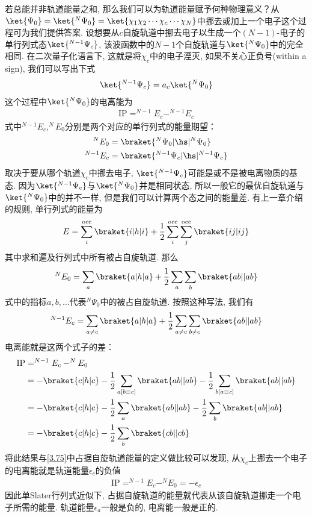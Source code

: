 若总能并非轨道能量之和, 那么我们可以为轨道能量赋予何种物理意义？从$\ket{\Psi_0}=\ket{^N\Psi_0}=\ket{\chi_1\chi_2\cdots\chi_c\cdots\chi_N}$中挪去或加上一个电子这个过程可为我们提供答案. 设想要从$c$自旋轨道中挪去电子以生成一个$(N-1)$-电子的单行列式态$\ket{^{N-1}\Psi_c}$, 该波函数中的$N-1$个自旋轨道与$\ket{^N\Psi_0}$中的完全相同. 在二次量子化语言下, 这就是将$\chi_c$中的电子湮灭, 如果不关心正负号(within a sign), 我们可以写出下式
\begin{align}
\ket{^{N-1}\Psi_c} = a_c\ket{^N\Psi_0}
\end{align}
这个过程中$\ket{^N\Psi_0}$的电离能为
\begin{align}
\mathrm{IP} = ^{N-1}E_c - ^{N-1}E_c
\end{align}
式中$^{N-1}E_c,^{N}E_0$分别是两个对应的单行列式的能量期望：
\begin{align}
^{N}E_0 & = \braket{^N\Psi_0|\hs|^N\Psi_0}\\
^{N-1}E_c&= \braket{^{N-1}\Psi_c|\hs|^{N-1}\Psi_c}
\end{align}
取决于要从哪个轨道$\chi_c$中挪去电子, $\ket{^{N-1}\Psi_c}$可能是或不是被电离物质的基态. 因为$\ket{^{N-1}\Psi_c}$与$\ket{^N\Psi_0}$并是相同状态, 所以一般它的最优自旋轨道与$\ket{^N\Psi_0}$中的并不一样, 但是我们可以计算两个态之间的能量差. 有上一章介绍的规则, 单行列式的能量为
\begin{align}
\label{3.87}
E = \sum_i^\mathrm{occ} \braket{i|h|i} + \frac{1}{2}\sum^\mathrm{occ}_i\sum^\mathrm{occ}_j\braket{ij|ij}
\end{align}
其中求和遍及行列式中所有被占自旋轨道. 那么
\begin{align}
\label{3.88}
^NE_0 = \sum_a\braket{a|h|a} + \frac{1}{2}\sum_a\sum_b\braket{ab||ab}
\end{align}
式中的指标$a,b,\ldots$代表$^N\Psi_0$中的被占自旋轨道. 按照这种写法, 我们有
\begin{align}
^{N-1}E_c = \sum_{a\neq c}\braket{a|h|a} + \frac{1}{2}\sum_{a\neq c}\sum_{b\neq c}\braket{ab||ab}
\end{align}
电离能就是这两个式子的差：
\begin{align}
\mathrm{IP} & = ^{N-1}E_c - ^NE_0\notag\\
            & = -\braket{c|h|c} - \frac{1}{2}\sum_{a[b\equiv c]}\braket{ab||ab}- \frac{1}{2}\sum_{b[a\equiv c]}\braket{ab||ab}\notag\\
            & = -\braket{c|h|c} - \frac{1}{2}\sum_{a}\braket{ab||ab}- \frac{1}{2}\sum_{b}\braket{ab||ab}\notag\\
            & = -\braket{c|h|c} - \frac{1}{2}\sum_{b}\braket{cb||cb}
\end{align}
将此结果与\eqref{3.75}中占据自旋轨道能量的定义做比较可以发现, 从$\chi_c$上挪去一个电子的电离能就是轨道能量$\epsilon_c$的负值
\begin{align}
\mathrm{IP} = ^{N-1}E_c - ^NE_0 = -\epsilon_c
\end{align}
因此单Slater行列式近似下, 占据自旋轨道的能量就代表从该自旋轨道挪走一个电子所需的能量. 轨道能量$\epsilon_a$一般是负的, 电离能一般是正的.

